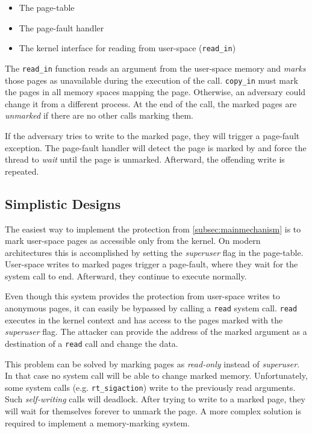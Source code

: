 \begin{itemize}
\item The page-table
\item The page-fault handler
\item The kernel interface for reading from user-space (\texttt{read\_in})
\end{itemize}

The \texttt{read\_in} function reads an argument from the user-space memory and
\emph{marks} those pages as unavailable during the execution of the call.
\texttt{copy\_in} must mark the pages in all memory spaces mapping the page.
Otherwise, an adversary could change it from a different process. At the end of
the call, the marked pages are \emph{unmarked} if there are no other calls
marking them.

If the adversary tries to write to the marked page, they will trigger a page-fault
exception. The page-fault handler will detect the page is marked by \sysname and
force the thread to \emph{wait} until the page is unmarked. Afterward, the 
offending write is repeated. 


\subsection{Simplistic Designs}
\label{subsec:simplistic}
The easiest way to implement the protection from \autoref{subsec:mainmechanism}
is to mark user-space pages as accessible only from the kernel. On modern
architectures this is accomplished by setting the \emph{superuser} flag in the
page-table. User-space writes to marked pages trigger a page-fault, where they
wait for the system call to end. Afterward, they continue to execute normally.

Even though this system provides the protection from user-space
writes to anonymous pages, it can easily be bypassed by calling a \texttt{read}
system call. \texttt{read} executes in the kernel context and has access to 
the pages marked with the \emph{superuser} flag. The attacker can provide the
address of the marked argument as a destination of a \texttt{read} call and 
change the data.

This problem can be solved by marking pages as \emph{read-only} instead of
\emph{superuser}. In that case no system call will be able to change marked
memory. Unfortunately, some system calls (e.g. \texttt{rt\_sigaction}) write to
the previously read arguments. Such \emph{self-writing} calls will deadlock.
After trying to write to a marked page, they will wait for themselves forever to
unmark the page. A more complex solution is required to implement a
memory-marking system.


